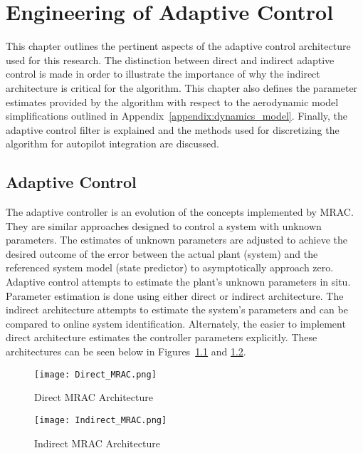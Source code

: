 \chapter{Engineering of Adaptive Control}\label{ch:adaptive_controller}
This chapter outlines the pertinent aspects of the \Lone adaptive control architecture used for this research.  The distinction between direct and indirect adaptive control is made in order to illustrate the importance of why the indirect architecture is critical for the \Lone algorithm.  This chapter also defines the parameter estimates provided by the \Lone algorithm with respect to the aerodynamic model simplifications outlined in Appendix~\ref{appendix:dynamics_model}.  Finally, the \Lone adaptive control filter is explained and the methods used for discretizing the algorithm for autopilot integration are discussed.

\section{\Lone Adaptive Control}
The \Lone adaptive controller is an evolution of the concepts implemented by \ac{MRAC}.  They are similar approaches designed to control a system with unknown parameters.  The estimates of unknown parameters are adjusted to achieve the desired outcome of the error between the actual plant (system) and the referenced system model (state predictor) to asymptotically approach zero.   Adaptive control attempts to estimate the plant's unknown parameters in situ.  Parameter estimation is done using either direct or indirect architecture.  The indirect architecture attempts to estimate the system's parameters and can be compared to online system identification.  Alternately, the easier to implement direct architecture estimates the controller parameters explicitly.  These architectures can be seen below in Figures~\ref{fig:direct_mrac} and \ref{fig:indirect_mrac}.

\begin{figure}[h!]
 \centering
  \texttt{[image: Direct\_MRAC.png]}
  \caption{Direct \ac{MRAC} Architecture }
  \label{fig:direct_mrac}
\end{figure}

\begin{figure}[h!]
 \centering
  \texttt{[image: Indirect\_MRAC.png]}
  \caption{Indirect \ac{MRAC} Architecture }
  \label{fig:indirect_mrac}
\end{figure}

